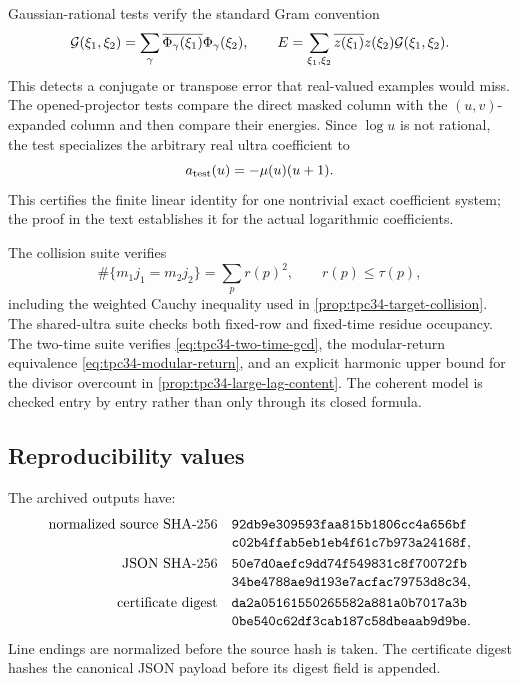 Gaussian-rational tests verify the standard Gram convention
\begin{equation}
 \mathcal G(\xi_1,\xi_2)
 =\sum_\gamma
 \overline{\Phi_\gamma(\xi_1)}\Phi_\gamma(\xi_2),
 \qquad
 E=\sum_{\xi_1,\xi_2}
 \overline{z(\xi_1)}z(\xi_2)\mathcal G(\xi_1,\xi_2).
 \label{eq:tpc34-certificate-Gram-convention}
\end{equation}
This detects a conjugate or transpose error that real-valued examples
would miss.  The opened-projector tests compare the direct masked column
with the \((u,v)\)-expanded column and then compare their energies.  Since
\(\log u\) is not rational, the test specializes the arbitrary real
ultra coefficient to
\[
 a_{\rm test}(u)=-\mu(u)(u+1).
\]
This certifies the finite linear identity for one nontrivial exact
coefficient system; the proof in the text establishes it for the actual
logarithmic coefficients.

The collision suite verifies
\[
 \#\{m_1j_1=m_2j_2\}=\sum_pr(p)^2,\qquad r(p)\le\tau(p),
\]
including the weighted Cauchy inequality used in
\cref{prop:tpc34-target-collision}.  The shared-ultra suite checks both
fixed-row and fixed-time residue occupancy.  The two-time suite verifies
\eqref{eq:tpc34-two-time-gcd}, the modular-return equivalence
\eqref{eq:tpc34-modular-return}, and an explicit harmonic upper bound for
the divisor overcount in \cref{prop:tpc34-large-lag-content}.  The
coherent model is checked entry by entry rather than only through its
closed formula.

\subsection{Reproducibility values}

The archived outputs have:
\begin{align}
 \text{normalized source SHA-256}\quad
 &\texttt{92db9e309593faa815b1806cc4a656bf}
 \notag\\[-0.2em]
 &\texttt{c02b4ffab5eb1eb4f61c7b973a24168f},
 \label{eq:tpc34-source-hash}\\
 \text{JSON SHA-256}\quad
 &\texttt{50e7d0aefc9dd74f549831c8f70072fb}
 \notag\\[-0.2em]
 &\texttt{34be4788ae9d193e7acfac79753d8c34},
 \label{eq:tpc34-json-hash}\\
 \text{certificate digest}\quad
 &\texttt{da2a05161550265582a881a0b7017a3b}
 \notag\\[-0.2em]
 &\texttt{0be540c62df3cab187c58dbeaab9d9be}.
 \label{eq:tpc34-certificate-digest}
\end{align}
Line endings are normalized before the source hash is taken.  The
certificate digest hashes the canonical JSON payload before its digest
field is appended.

